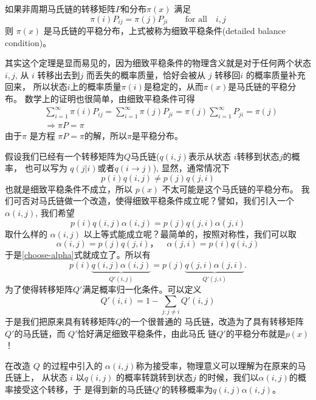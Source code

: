 \begin{theorem}[细致平稳条件]
如果非周期马氏链的转移矩阵$P$和分布$\pi(x)$ 满足
\begin{equation}
\pi(i)P_{ij} = \pi(j)P_{ji} \quad\quad \text{for all} \quad i,j
\end{equation}
则 $\pi(x)$ 是马氏链的平稳分布，上式被称为细致平稳条件(detailed balance condition)。
\end{theorem}

其实这个定理是显而易见的，因为细致平稳条件的物理含义就是对于任何两个状态$i,j$,
从 $i$ 转移出去到$j$ 而丢失的概率质量，恰好会被从 $j$ 转移回$i$ 的概率质量补充回来，
所以状态$i$上的概率质量$\pi(i)$是稳定的，从而$\pi(x)$是马氏链的平稳分布。
数学上的证明也很简单，由细致平稳条件可得
\begin{align*}
& \sum_{i=1}^\infty \pi(i)P_{ij} = \sum_{i=1}^\infty \pi(j)P_{ji}
= \pi(j) \sum_{i=1}^\infty P_{ji} = \pi(j) \\
& \Rightarrow \pi P = \pi
\end{align*}
由于$\pi$ 是方程 $\pi P = \pi$的解，所以$\pi$是平稳分布。


假设我们已经有一个转移矩阵为$Q$马氏链($q(i,j)$表示从状态 $i$转移到状态$j$的概率，
也可以写为 $q(j|i)$或者$q(i\rightarrow j)$),
显然，通常情况下
$$ p(i) q(i,j) \neq p(j) q(j,i) $$
也就是细致平稳条件不成立，所以 $p(x)$ 不太可能是这个马氏链的平稳分布。
我们可否对马氏链做一个改造，使得细致平稳条件成立呢？譬如，我们引入一个 $\alpha(i,j)$,
我们希望
\begin{equation}
\label{choose-alpha}
 p(i) q(i,j)\alpha(i,j) = p(j) q(j,i)\alpha(j,i)
\end{equation}
取什么样的 $\alpha(i,j)$ 以上等式能成立呢？最简单的，按照对称性，我们可以取
$$ \alpha(i,j)= p(j) q(j,i)， \quad \alpha(j,i) = p(i) q(i,j)$$
于是\eqref{choose-alpha}式就成立了。所以有
\begin{equation}
\label{detailed-balance}
p(i) \underbrace{q(i,j)\alpha(i,j)}_{Q'(i,j)}
= p(j) \underbrace{q(j,i)\alpha(j,i)}_{Q'(j,i)} .
\end{equation}
为了使得转移矩阵$Q'$满足概率归一化条件。可以定义
$$ Q'(i,i) = 1- \sum_{j:j \neq i}  Q'(i,j) $$
于是我们把原来具有转移矩阵$Q$的一个很普通的
马氏链，改造为了具有转移矩阵$Q'$的马氏链，而 $Q'$恰好满足细致平稳条件，由此马氏
链$Q'$的平稳分布就是$p(x)$！

在改造 $Q$ 的过程中引入的 $\alpha(i,j)$称为接受率，物理意义可以理解为在原来的马氏链上，
从状态 $i$ 以$q(i,j)$ 的概率转跳转到状态$j$ 的时候，我们以$\alpha(i,j)$的概率接受这个转移，于
是得到新的马氏链$Q'$的转移概率为$q(i,j)\alpha(i,j)$。

